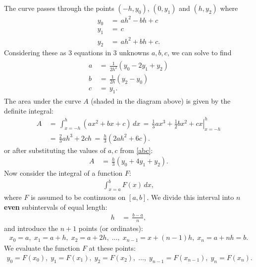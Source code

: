 \documentclass[12pt]{tjwNOTES}
\begin{document}
The curve passes through the points $(-h,y_{0})$, $(0,y_{1})$ and $(h,y_{2})$ where
\begin{align*}
	y_{0} &\,=\, ah^{2} - bh + c	\\
	y_{1} &\,=\, c	\\
	y_{2} &\,=\, ah^{2} + bh + c.
\end{align*}
Considering these as 3 equations in 3 unknowns $a,b,c$, we can solve to find
\begin{align}\label{abc}
	\begin{split}
		a &\,=\, \frac{1}{2h^{2}}(y_{0}-2y_{1}+y_{2}) \\[0.3cm]
		b &\,=\, \frac{1}{2h}(y_{2}-y_{0}) \\[0.3cm]
		c &\,=\, y_{1}.
	\end{split}
\end{align}
The area under the curve $A$ (shaded in the diagram above) is given by the definite integral:
\begin{align*}
	A &\,=\, \int_{x=-h}^{h} (ax^{2}+ bx + c) \,dx \,=\, \left.\frac{1}{3}ax^{3} + \frac{1}{2}bx^{2} + cx\right|_{x=-h}^{h} \\[0.2cm]
		&\,=\, \frac{2}{3}ah^{3} + 2ch \,=\, \frac{h}{3}(2ah^{2} + 6c).
\end{align*}
or after substituting the values of $a,c$ from \eqref{abc}:
\begin{align*}
	A &\,=\, \frac{h}{3}(y_{0}+4y_{1}+y_{2}).
\end{align*}
Now consider the integral of a function $F$: 
\begin{align}\label{INT}
	\int_{x=a}^{b} F(x) \,dx,
\end{align}
where $F$ is assumed to be continuous on $[a,b]$. We divide this interval into $n$ {\bf even} subintervals of equal length:
\begin{align*}
	h &\,=\, \frac{b-a}{n},
\end{align*}
and introduce the $n+1$ points (or ordinates):
\begin{align*}
	x_{0}=a, \; x_{1}=a+h, \; x_{2}=a+2h,\; \ldots,\; x_{n-1}=x+(n-1)h,\; x_{n}=a+nh=b.
\end{align*}
We evaluate the function $F$ at these points:
\begin{align*}
	y_{0}=F(x_{0}), \; y_{1}=F(x_{1}), \; y_{2}=F(x_{2}),\; \ldots,\; y_{n-1}=F(x_{n-1}),\; y_{n}=F(x_{n}).
\end{align*}
\quad\\[-0.2cm]
\end{document}
